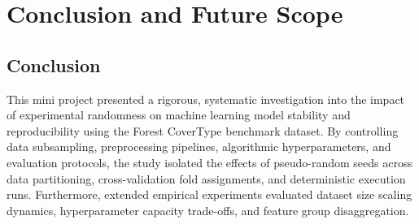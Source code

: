\chapter{Conclusion and Future Scope}
\label{ch:conclusion}

\section{Conclusion}
\label{sec:conclusion}

This mini project presented a rigorous, systematic investigation into the impact of experimental randomness on machine learning model stability and reproducibility using the Forest CoverType benchmark dataset. By controlling data subsampling, preprocessing pipelines, algorithmic hyperparameters, and evaluation protocols, the study isolated the effects of pseudo-random seeds across data partitioning, cross-validation fold assignments, and deterministic execution runs. Furthermore, extended empirical experiments evaluated dataset size scaling dynamics, hyperparameter capacity trade-offs, and feature group disaggregation.

